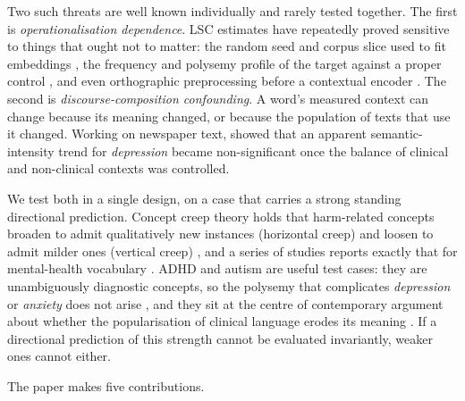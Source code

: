 \documentclass[final]{clv2025}
\begin{document}
Two such threats are well known individually and rarely tested together. The first is
\emph{operationalisation dependence}. LSC estimates have repeatedly proved sensitive to
things that ought not to matter: the random seed and corpus slice used to fit embeddings
\citep{antoniak-mimno-2018-evaluating}, the frequency and polysemy profile of the target
against a proper control \citep{dubossarsky-etal-2017-outta}, and even orthographic
preprocessing before a contextual encoder \citep{laicher-etal-2021-explaining}. The second
is \emph{discourse-composition confounding}. A word's measured context can change because
its meaning changed, or because the population of texts that use it changed. Working on
newspaper text, \citet{pislRevisitingSemanticSeverity2025} showed that an apparent
semantic-intensity trend for \emph{depression} became non-significant once the balance of
clinical and non-clinical contexts was controlled.

We test both in a single design, on a case that carries a strong standing directional
prediction. Concept creep theory holds that harm-related concepts broaden to admit
qualitatively new instances (horizontal creep) and loosen to admit milder ones (vertical
creep) \citep{haslamConceptCreepPsychologys2016,haslamHarmInflationMaking2020}, and a
series of studies reports exactly that for mental-health vocabulary
\citep{vylomovaSemanticChangesHarmrelated2021,baesSemanticInflationTrauma2023,baesSemanticShiftsMental2023}.
ADHD and autism are useful test cases: they are unambiguously diagnostic concepts, so the
polysemy that complicates \emph{depression} or \emph{anxiety} does not arise
\citep{xiaoHaveConceptsAnxiety2023}, and they sit at the centre of contemporary argument
about whether the popularisation of clinical language erodes its meaning
\citep{isern-masUnmaskingTherapyspeak2025,spencerIsntEveryoneLittle2021}. If a
directional prediction of this strength cannot be evaluated invariantly, weaker ones
cannot either.

The paper makes five contributions.
\end{document}

